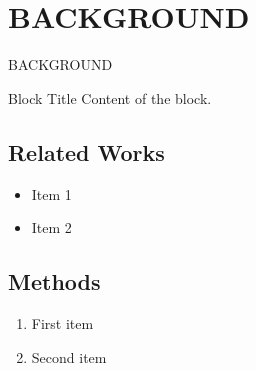 \section{BACKGROUND}
\begin{frame}{BACKGROUND}
  \begin{block}{Block Title}
    Content of the block.
  \end{block}

  \subsection{Related Works}
  \begin{itemize}
    \item Item 1
    \item Item 2
  \end{itemize}
  

  
  \subsection{Methods}  
  \begin{enumerate}
    \item First item
    \item Second item
  \end{enumerate}
 
\end{frame}

